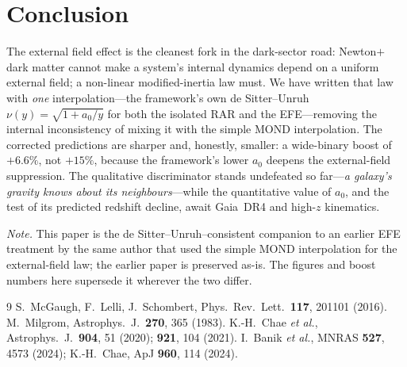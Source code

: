 \documentclass[aps,prd,twocolumn,10pt,nofootinbib]{revtex4-2}
\begin{document}
\section{Conclusion}
The external field effect is the cleanest fork in the dark-sector road: Newton$+$dark matter cannot make a
system's internal dynamics depend on a uniform external field; a non-linear modified-inertia law must. We have
written that law with \emph{one} interpolation---the framework's own de Sitter--Unruh $\nu(y)=\sqrt{1+a_0/y}$ for
both the isolated RAR and the EFE---removing the internal inconsistency of mixing it with the simple MOND
interpolation. The corrected predictions are sharper and, honestly, smaller: a wide-binary boost of $+6.6\%$, not
$+15\%$, because the framework's lower $a_0$ deepens the external-field suppression. The qualitative discriminator
stands undefeated so far---\emph{a galaxy's gravity knows about its neighbours}---while the quantitative value of
$a_0$, and the test of its predicted redshift decline, await Gaia~DR4 and high-$z$ kinematics.

\emph{Note.} This paper is the de Sitter--Unruh--consistent companion to an earlier EFE treatment by the same
author that used the simple MOND interpolation for the external-field law; the earlier paper is preserved as-is.
The figures and boost numbers here supersede it wherever the two differ.

\begin{thebibliography}{9}
 S.~McGaugh, F.~Lelli, J.~Schombert, Phys.\ Rev.\ Lett.\ \textbf{117}, 201101 (2016).
 M.~Milgrom, Astrophys.\ J.\ \textbf{270}, 365 (1983).
 K.-H.~Chae \emph{et al.}, Astrophys.\ J.\ \textbf{904}, 51 (2020); \textbf{921}, 104 (2021).
 I.~Banik \emph{et al.}, MNRAS \textbf{527}, 4573 (2024); K.-H.~Chae, ApJ \textbf{960}, 114 (2024).
\end{thebibliography}
\end{document}
